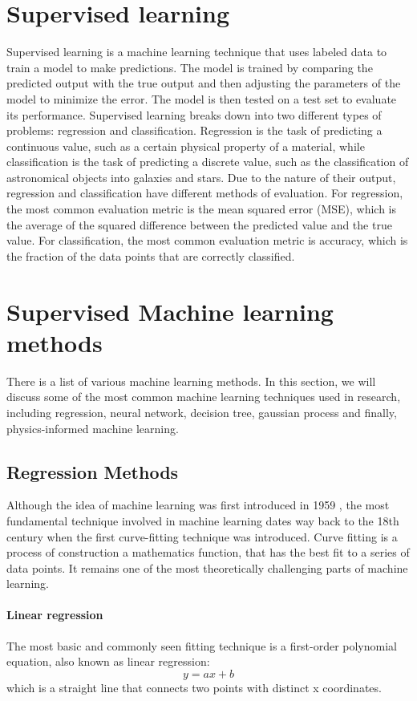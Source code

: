 \documentclass[aps,prb,twocolumn,superscriptaddress,floatfix]{revtex4-2}
\newcounter{para}
\begin{document}
\section{Supervised learning}
Supervised learning is a machine learning technique that uses labeled data to train a model to make predictions. The model is trained by comparing the predicted output with the true output and then adjusting the parameters of the model to minimize the error. The model is then tested on a test set to evaluate its performance\cite{ibmWhatSupervised}.
Supervised learning breaks down into two different types of problems: regression and classification.
Regression is the task of predicting a continuous value, such as a certain physical property of a material, while classification is the task of predicting a discrete value, such as the classification of astronomical objects into galaxies and stars.
Due to the nature of their output, regression and classification have different methods of evaluation. For regression, the most common evaluation metric is the mean squared error (MSE), which is the average of the squared difference between the predicted value and the true value. For classification, the most common evaluation metric is accuracy, which is the fraction of the data points that are correctly classified.

\section{Supervised Machine learning methods}
There is a list of various machine learning methods. In this section, we will discuss some of the most common machine learning techniques used in research, including regression, neural network, decision tree, gaussian process and finally, physics-informed machine learning.

\subsection{Regression Methods}
Although the idea of machine learning was first introduced in 1959
\cite{samuel1959some},
the most fundamental technique involved in machine learning dates way back to the 18th century when the first curve-fitting technique was introduced. Curve fitting is a process of construction a mathematics function, that has the best fit to a series of data points. It remains one of the most theoretically challenging parts of machine learning\cite{towardsdatascienceDeepDive}.\\
\paragraph{Linear regression}
The most basic and commonly seen fitting technique is a first-order polynomial equation, also known as linear regression:
\begin{equation}
    y=ax+b
\end{equation}
which is a straight line that connects two points with distinct x coordinates.\\
\end{document}
